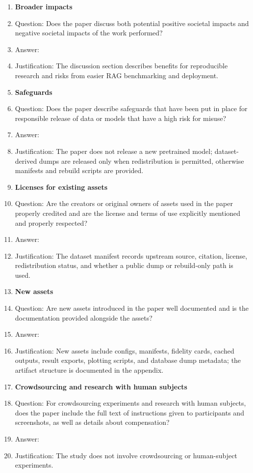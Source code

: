 \begin{enumerate}
\item {\bf Broader impacts}
\item[] Question: Does the paper discuss both potential positive societal impacts and negative societal impacts of the work performed?
\item[] Answer: \answerYes{}
\item[] Justification: The discussion section describes benefits for reproducible research and risks from easier RAG benchmarking and deployment.

\item {\bf Safeguards}
\item[] Question: Does the paper describe safeguards that have been put in place for responsible release of data or models that have a high risk for misuse?
\item[] Answer: \answerYes{}
\item[] Justification: The paper does not release a new pretrained model; dataset-derived dumps are released only when redistribution is permitted, otherwise manifests and rebuild scripts are provided.

\item {\bf Licenses for existing assets}
\item[] Question: Are the creators or original owners of assets used in the paper properly credited and are the license and terms of use explicitly mentioned and properly respected?
\item[] Answer: \answerYes{}
\item[] Justification: The dataset manifest records upstream source, citation, license, redistribution status, and whether a public dump or rebuild-only path is used.

\item {\bf New assets}
\item[] Question: Are new assets introduced in the paper well documented and is the documentation provided alongside the assets?
\item[] Answer: \answerYes{}
\item[] Justification: New assets include configs, manifests, fidelity cards, cached outputs, result exports, plotting scripts, and database dump metadata; the artifact structure is documented in the appendix.

\item {\bf Crowdsourcing and research with human subjects}
\item[] Question: For crowdsourcing experiments and research with human subjects, does the paper include the full text of instructions given to participants and screenshots, as well as details about compensation?
\item[] Answer: \answerNA{}
\item[] Justification: The study does not involve crowdsourcing or human-subject experiments.


\end{enumerate}

